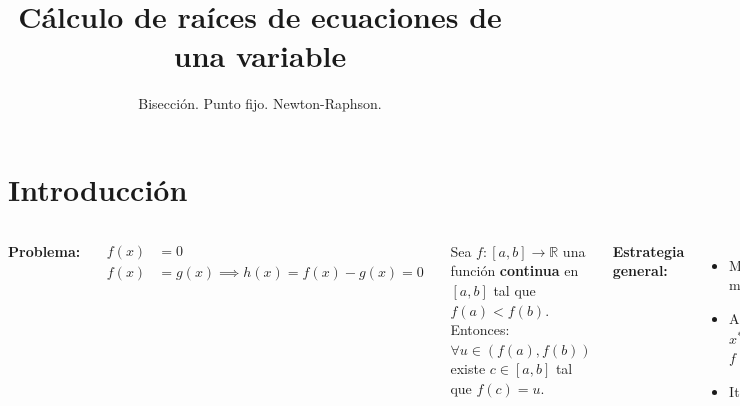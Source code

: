 \documentclass[9pt, aspectratio=169]{beamer}
\title{Cálculo de raíces de ecuaciones de una variable}
\subtitle{Bisección. Punto fijo. Newton-Raphson.}
\begin{document}
\maketitle

\section{Introducción}

\begin{frame}
  \begin{columns}[t]
    \cx
    \textbf{Problema:}

    \begin{equation*}
      \begin{split}
        f(x) & = 0                                    \\
        f(x) & = g(x) \implies h(x) = f(x) - g(x) = 0
      \end{split}
    \end{equation*}

    \begin{theorem}
      Sea $f: [a, b] \rightarrow \mathbb{R}$ una función \textbf{continua} en $[a, b]$ tal que $f(a) < f(b)$. Entonces: $\forall u \in (f(a), f(b))$ existe $c \in [a, b]$ tal que $f(c) = u$.
    \end{theorem}
    \pause

    \textbf{Estrategia general:} %
    \begin{itemize}
      \item Mostrar que existe al menos una solución ($x^*$)
      \item Aislar una raíz: $D \subset \mathbb{R}$, $x^* \in D$ y $f(x) \neq 0 \; \forall x \in D \setminus \{ x^* \}$
      \item Iterar
    \end{itemize}
    \pause


\end{columns}
\end{frame}
\end{document}
